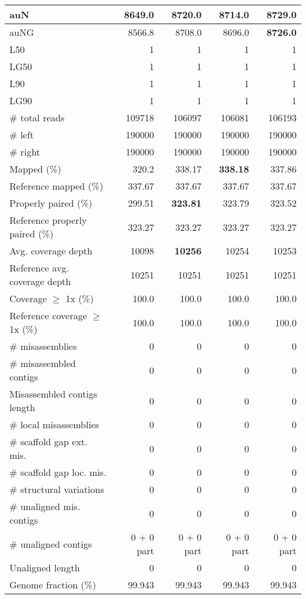 \documentclass[12pt,a4paper]{article}
\begin{document}
\begin{table}[ht]
\begin{center}
\begin{tabular}{|l*{4}{|r}|}
auN & 8649.0 & 8720.0 & 8714.0 & {\bf 8729.0} \\ \hline
auNG & 8566.8 & 8708.0 & 8696.0 & {\bf 8726.0} \\ \hline
L50 & 1 & 1 & 1 & 1 \\ \hline
LG50 & 1 & 1 & 1 & 1 \\ \hline
L90 & 1 & 1 & 1 & 1 \\ \hline
LG90 & 1 & 1 & 1 & 1 \\ \hline
\# total reads & 109718 & 106097 & 106081 & 106193 \\ \hline
\# left & 190000 & 190000 & 190000 & 190000 \\ \hline
\# right & 190000 & 190000 & 190000 & 190000 \\ \hline
Mapped (\%) & 320.2 & 338.17 & {\bf 338.18} & 337.86 \\ \hline
Reference mapped (\%) & 337.67 & 337.67 & 337.67 & 337.67 \\ \hline
Properly paired (\%) & 299.51 & {\bf 323.81} & 323.79 & 323.52 \\ \hline
Reference properly paired (\%) & 323.27 & 323.27 & 323.27 & 323.27 \\ \hline
Avg. coverage depth & 10098 & {\bf 10256} & 10254 & 10253 \\ \hline
Reference avg. coverage depth & 10251 & 10251 & 10251 & 10251 \\ \hline
Coverage $\geq$ 1x (\%) & 100.0 & 100.0 & 100.0 & 100.0 \\ \hline
Reference coverage $\geq$ 1x (\%) & 100.0 & 100.0 & 100.0 & 100.0 \\ \hline
\# misassemblies & 0 & 0 & 0 & 0 \\ \hline
\# misassembled contigs & 0 & 0 & 0 & 0 \\ \hline
Misassembled contigs length & 0 & 0 & 0 & 0 \\ \hline
\# local misassemblies & 0 & 0 & 0 & 0 \\ \hline
\# scaffold gap ext. mis. & 0 & 0 & 0 & 0 \\ \hline
\# scaffold gap loc. mis. & 0 & 0 & 0 & 0 \\ \hline
\# structural variations & 0 & 0 & 0 & 0 \\ \hline
\# unaligned mis. contigs & 0 & 0 & 0 & 0 \\ \hline
\# unaligned contigs & 0 + 0 part & 0 + 0 part & 0 + 0 part & 0 + 0 part \\ \hline
Unaligned length & 0 & 0 & 0 & 0 \\ \hline
Genome fraction (\%) & 99.943 & 99.943 & 99.943 & 99.943 \\ \hline

\end{tabular}
\end{center}
\end{table}
\end{document}
